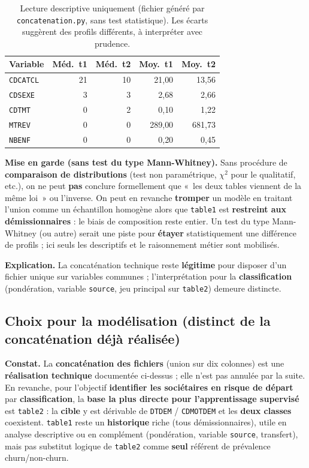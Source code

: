 \documentclass[11pt,a4paper]{article}
\begin{document}
\begin{table}[htbp]
  \centering
  \small
  \begin{tabular}{@{}lrrrr@{}}
    \toprule
    Variable & Méd.\ t1 & Méd.\ t2 & Moy.\ t1 & Moy.\ t2 \\
    \midrule
    \texttt{CDCATCL} & 21 & 10 & 21{,}00 & 13{,}56 \\
    \texttt{CDSEXE}  &  3 &  3 &  2{,}68 &  2{,}66 \\
    \texttt{CDTMT}   &  0 &  2 &  0{,}10 &  1{,}22 \\
    \texttt{MTREV}   &  0 &  0 & 289{,}00 & 681{,}73 \\
    \texttt{NBENF}   &  0 &  0 &  0{,}20 &  0{,}45 \\
    \bottomrule
  \end{tabular}
  \caption{Lecture descriptive uniquement (fichier généré par \texttt{concatenation.py}, sans test statistique). Les écarts suggèrent des profils différents, à interpréter avec prudence.}
  \label{tab:desc}
\end{table}

\textbf{Mise en garde (sans test du type Mann-Whitney).} Sans procédure de \textbf{comparaison de distributions} (test non paramétrique, $\chi^2$ pour le qualitatif, etc.), on ne peut \textbf{pas} conclure formellement que «~les deux tables viennent de la même loi~» ou l'inverse. On peut en revanche \textbf{tromper} un modèle en traitant l'union comme un échantillon homogène alors que \texttt{table1} est \textbf{restreint aux démissionnaires} : le biais de composition reste entier. Un test du type Mann-Whitney (ou autre) serait une piste pour \textbf{étayer} statistiquement une différence de profils ; ici seuls les descriptifs et le raisonnement métier sont mobilisés.

\textbf{Explication.} La concaténation technique reste \textbf{légitime} pour disposer d'un fichier unique sur variables communes ; l'interprétation pour la \textbf{classification} (pondération, variable \texttt{source}, jeu principal sur \texttt{table2}) demeure distincte.

\subsection{Choix pour la modélisation (distinct de la concaténation déjà réalisée)}

\textbf{Constat.} La \textbf{concaténation des fichiers} (union sur dix colonnes) est une \textbf{réalisation technique} documentée ci-dessus ; elle n'est pas annulée par la suite. En revanche, pour l'objectif \textbf{identifier les sociétaires en risque de départ} par \textbf{classification}, la \textbf{base la plus directe pour l'apprentissage supervisé} est \texttt{table2} : la \textbf{cible} y est dérivable de \texttt{DTDEM} / \texttt{CDMOTDEM} et les \textbf{deux classes} coexistent. \texttt{table1} reste un \textbf{historique} riche (tous démissionnaires), utile en analyse descriptive ou en complément (pondération, variable \texttt{source}, transfert), mais pas substitut logique de \texttt{table2} comme \textbf{seul} référent de prévalence churn/non-churn.
\end{document}
